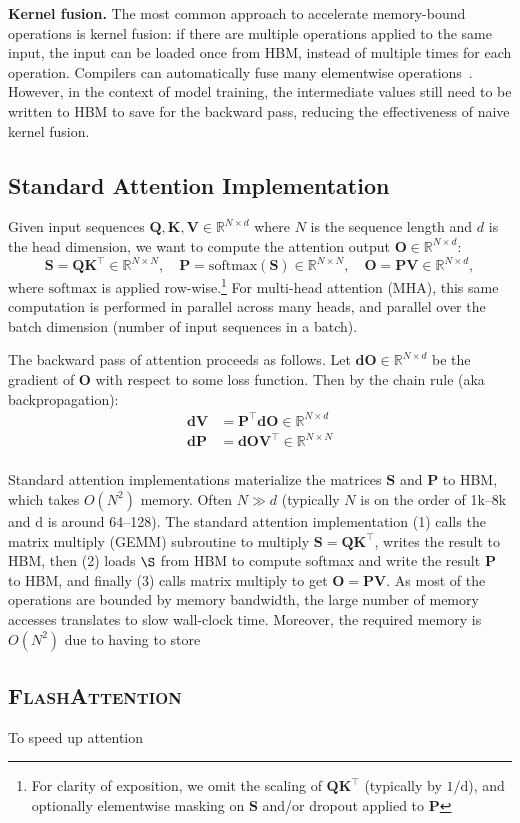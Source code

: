 \message{ !name(../flash2.tex)}\documentclass{article}
\newcommand{\softmax}{\mathrm{softmax}}
\newcommand{\vQ}{\mathbf{Q}}
\newcommand{\vK}{\mathbf{K}}
\newcommand{\vV}{\mathbf{V}}
\newcommand{\vdV}{\mathbf{dV}}
\newcommand{\vS}{\mathbf{S}}
\newcommand{\vP}{\mathbf{P}}
\newcommand{\vdP}{\mathbf{dP}}
\newcommand{\vO}{\mathbf{O}}
\newcommand{\vdO}{\mathbf{dO}}
\newcommand{\sysnameone}{\textsc{FlashAttention}\xspace}
\begin{document}
\textbf{Kernel fusion.}
The most common approach to accelerate memory-bound operations is
kernel fusion: if there are multiple operations applied to the same input,
the input can be loaded once from HBM, instead of multiple times for each operation.
Compilers can automatically fuse many elementwise operations~\citep{li2020deep, paszke2019pytorch, sabne2020xla}.
However, in the context of model training, the intermediate values still need
to be written to HBM to save for the backward pass, reducing the
effectiveness of naive kernel fusion.

\subsection{Standard Attention Implementation}
\label{subsec:standard_attn}

Given input sequences $\vQ, \vK, \vV \in \mathbb{R}^{N \times d}$ where $N$ is the sequence length and
$d$ is the head dimension, we want to compute the attention output $\vO \in \mathbb{R}^{N \times d}$:
\begin{equation*}
  \vS = \vQ \vK^\top \in \mathbb{R}^{N \times N}, \quad \vP = \softmax(\vS) \in \mathbb{R}^{N \times N}, \quad \vO = \vP\vV \in \mathbb{R}^{N \times d},
\end{equation*}
where $\softmax$ is applied row-wise.\footnote{For clarity of exposition, we
  omit the scaling of $\vQ \vK^\top$ (typically by $1/\mathrm{d}$), and optionally
  elementwise masking on $\vS$ and/or dropout applied to $\vP$} For multi-head
attention (MHA), this same computation is performed in parallel across many
heads, and parallel over the batch dimension (number of input sequences in a
batch).

The backward pass of attention proceeds as follows.
Let $\vdO \in \mathbb{R}^{N \times d}$ be the gradient of $\vO$ with respect to some loss
function. Then by the chain rule (aka backpropagation):
\begin{align*}
  \vdV &= \vP^\top \vdO \in \mathbb{R}^{N \times d} \\
  \vdP &= \vdO \vV^\top \in \mathbb{R}^{N \times N} \\
\end{align*}

Standard attention implementations materialize the matrices $\vS$ and $\vP$ to
HBM, which takes $O(N^2)$ memory.
Often $N \gg d$ (typically $N$ is on the order of 1k--8k and d is around 64--128).
The standard attention implementation (1) calls the matrix multiply (GEMM)
subroutine to multiply $\vS = \vQ \vK^\top$, writes the result to HBM, then (2) loads
$\S$ from HBM to compute softmax and write the result $\vP$ to HBM, and finally
(3) calls matrix multiply to get $\vO = \vP \vV$.
As most of the operations are bounded by memory bandwidth, the large number of
memory accesses translates to slow wall-clock time.
Moreover, the required memory is $O(N^2)$ due to having to store

\subsection{\sysnameone}
\label{subsec:flashv1}

To speed up attention

\end{document}
